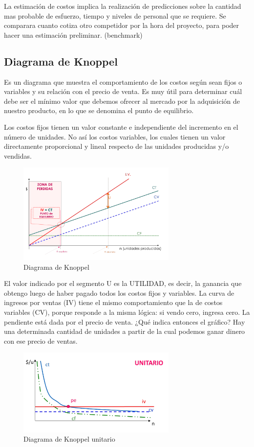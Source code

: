 \documentclass[titlepage,a4paper]{article}
\begin{document}
La estimación de costos implica la realización de predicciones sobre la cantidad mas probable de esfuerzo, tiempo y niveles de personal que se requiere.
Se comparara cuanto cotiza otro competidor por la hora del proyecto, para poder hacer una estimación preliminar. (benchmark)

\newpage

\subsection{Diagrama de Knoppel}
Es un diagrama que muestra el comportamiento de los costos según sean fijos o variables y su relación con el precio de venta. Es muy útil para determinar cuál debe 
ser el mínimo valor que debemos ofrecer al mercado por la adquisición de nuestro producto, en lo que 
se denomina el punto de equilibrio.

Los costos fijos tienen un valor constante e independiente del incremento 
en el número de unidades. No así los costos variables, los cuales tienen un valor directamente 
proporcional y lineal respecto de las unidades producidas y/o vendidas.

\begin{figure}[!htb]
    \centering
    \includegraphics[width=0.7\textwidth]{imagenes/Diagrama Knoppel.PNG}
    \caption{Diagrama de Knoppel}
\end{figure}

El valor indicado por el segmento U es la UTILIDAD, es decir, la ganancia que obtengo luego de haber 
pagado todos los costos fijos y variables. La curva de ingresos por ventas (IV) tiene el mismo 
comportamiento que la de costos variables (CV), porque responde a la misma lógica: si vendo cero, 
ingresa cero. La pendiente está dada por el precio de venta. ¿Qué indica entonces el gráfico? Hay una 
determinada cantidad de unidades a partir de la cual podemos ganar dinero con ese precio de ventas.

\begin{figure}[!htb]
    \centering
    \includegraphics[width=0.7\textwidth]{imagenes/KnoppelUnitario.PNG}
    \caption{Diagrama de Knoppel unitario}
\end{figure}
\end{document}
